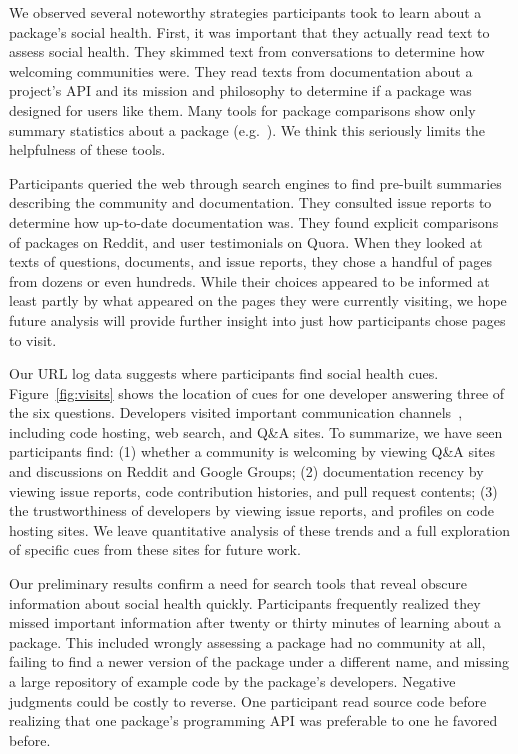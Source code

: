 We observed several noteworthy strategies participants took to learn about a package's social health.
First, it was important that they actually read text to assess social health.
They skimmed text from conversations to determine how welcoming communities were.
They read texts from documentation about a project's API and its mission and philosophy to determine if a package was designed for users like them.
Many tools for package comparisons show only summary statistics about a package (e.g.~\cite{awesome_python,ruby_toolbox}).
We think this seriously limits the helpfulness of these tools.

Participants queried the web through search engines to find pre-built summaries describing the community and documentation.
They consulted issue reports to determine how up-to-date documentation was.
They found explicit comparisons of packages on Reddit, and user testimonials on Quora.
When they looked at texts of questions, documents, and issue reports, they chose a handful of pages from dozens or even hundreds.
While their choices appeared to be informed at least partly by what appeared on the pages they were currently visiting, we hope future analysis will provide further insight into just how participants chose pages to visit.

Our URL log data suggests where participants find social health cues.
Figure~\ref{fig:visits} shows the location of cues for one developer answering three of the six questions.
Developers visited important communication channels~\cite{storey_revolution_2014}, including code hosting, web search, and Q\&A sites.
To summarize, we have seen participants find:
(1) whether a community is welcoming by viewing Q\&A sites and discussions on Reddit and Google Groups;
(2) documentation recency by viewing issue reports, code contribution histories, and pull request contents;
(3) the trustworthiness of developers by viewing issue reports, and profiles on code hosting sites.
We leave quantitative analysis of these trends and a full exploration of specific cues from these sites for future work.

Our preliminary results confirm a need for search tools that reveal obscure information about social health quickly.
Participants frequently realized they missed important information after twenty or thirty minutes of learning about a package.
This included wrongly assessing a package had no community at all, failing to find a newer version of the package under a different name, and missing a large repository of example code by the package's developers.
Negative judgments could be costly to reverse.
One participant read source code before realizing that one package's programming API was preferable to one he favored before.

